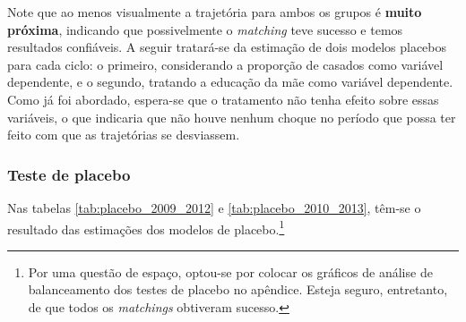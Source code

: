 Note que ao menos visualmente a trajetória para ambos os grupos é \textbf{muito próxima}, indicando que possivelmente o \textit{matching} teve sucesso e temos resultados confiáveis. A seguir tratará-se da estimação de dois modelos placebos para cada ciclo: o primeiro, considerando a proporção de casados como variável dependente, e o segundo, tratando a educação da mãe como variável dependente. Como já foi abordado, espera-se que o tratamento não tenha efeito sobre essas variáveis, o que indicaria que não houve nenhum choque no período que possa ter feito com que as trajetórias se desviassem.

\subsubsection{Teste de placebo}

Nas tabelas \ref{tab:placebo_2009_2012} e \ref{tab:placebo_2010_2013}, têm-se o resultado das estimações dos modelos de placebo.\footnote{Por uma questão de espaço, optou-se por colocar os gráficos de análise de balanceamento dos testes de placebo no apêndice. Esteja seguro, entretanto, de que todos os \textit{matchings} obtiveram sucesso.}

